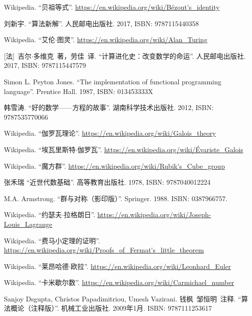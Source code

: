 \documentclass[UTF8]{article}
\begin{document}
\begin{thebibliography}{99}
Wikipedia. ``贝祖等式''. \url{https://en.wikipedia.org/wiki/Bézout's_identity}

刘新宇. ``算法新解''. 人民邮电出版社. 2017, ISBN: 9787115440358

Wikipedia. ``艾伦$\cdot$图灵''. \url{https://en.wikipedia.org/wiki/Alan_Turing}

[法]\ 吉尔$\cdot$多维克\ 著，劳佳\ 译. ``计算进化史：改变数学的命运''. 人民邮电出版社. 2017, ISBN: 9787115447579

Simon L. Peyton Jones. ``The implementation of functional programming language''. Prentice Hall. 1987, ISBN: 013453333X


韩雪涛. ``好的数学——方程的故事''. 湖南科学技术出版社. 2012, ISBN: 9787535770066

Wikipedia. ``伽罗瓦理论''. \url{https://en.wikipedia.org/wiki/Galois_theory}

Wikipedia. ``埃瓦里斯特$\cdot$伽罗瓦''. \url{https://en.wikipedia.org/wiki/Évariste_Galois}

Wikipedia. ``魔方群''. \url{https://en.wikipedia.org/wiki/Rubik's_Cube_group}

张禾瑞 ``近世代数基础''. 高等教育出版社. 1978, ISBN: 9787040012224

M.A. Armstrong. ``群与对称（影印版）''. Springer. 1988. ISBN: 0387966757.

Wikipedia. ``约瑟夫$\cdot$拉格朗日''. \url{https://en.wikipedia.org/wiki/Joseph-Louis_Lagrange}

Wikipedia. ``费马小定理的证明''. \url{https://en.wikipedia.org/wiki/Proofs_of_Fermat's_little_theorem}

Wikipedia. ``莱昂哈德$\cdot$欧拉''. \url{https://en.wikipedia.org/wiki/Leonhard_Euler}

Wikipedia. ``卡米歇尔数''. \url{https://en.wikipedia.org/wiki/Carmichael_number}

Sanjoy Dsgupta, Christos Papadimitriou, Umesh Vazirani. 钱枫\ 邹恒明\ 注释. ``算法概论（注释版）''. 机械工业出版社. 2009年1月. ISBN: 9787111253617


\end{thebibliography}
\end{document}
